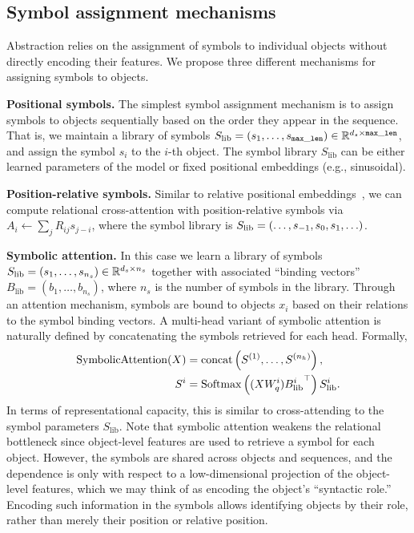 \subsection{Symbol assignment mechanisms}\label{ssec:symbol_assignment}
Abstraction relies on the assignment of symbols to individual objects without directly encoding their features. We propose three different mechanisms for assigning symbols to objects.

\textbf{Positional symbols.} The simplest symbol assignment mechanism is to assign symbols to objects sequentially based on the order they appear in the sequence. That is, we maintain a library of symbols $S_{\mathrm{lib}} = (s_1, \ldots, s_{\mathtt{max\_len}}) \in \mathbb{R}^{d_s \times \mathtt{max\_len}}$, and assign the symbol $s_i$ to the $i$-th object. The symbol library $S_\mathrm{lib}$ can be either learned parameters of the model or fixed positional embeddings (e.g., sinusoidal). %

\textbf{Position-relative symbols.} Similar to relative positional embeddings~\citep{shaw2018self,kazemnejadImpactPositionalEncoding2023}, we can compute relational cross-attention with position-relative symbols via $A_i \gets \sum_j R_{ij} s_{j-i}$, where the symbol library is $S_{\mathrm{lib}} = \left(\ldots, s_{-1}, s_0, s_1, \ldots\right)$.

\textbf{Symbolic attention.} In this case we learn a library of symbols $S_{\mathrm{lib}} = (s_1, \ldots, s_{n_s}) \in \mathbb{R}^{d_s \times n_s}$ together with associated ``binding vectors'' $B_{\mathrm{lib}} = (b_1, \ldots, b_{n_s})$, where $n_s$ is the number of symbols in the library. Through an attention mechanism, symbols are bound to objects $x_i$ based on their relations to the symbol binding vectors. A multi-head variant of symbolic attention is naturally defined by concatenating the symbols retrieved for each head. Formally, 
\begin{equation}
    \begin{split}
        \mathrm{SymbolicAttention}(X) &= \mathrm{concat}\left(S^{(1)}, \ldots, S^{(n_h)}\right), \\
        S^{i} &= \mathrm{Softmax} \left((X W_q^{i}) {B_{\mathrm{lib}}^{i}}^\top\right) S_{\mathrm{lib}}^{i}.
    \end{split}
\end{equation}
In terms of representational capacity, this is similar to cross-attending to the symbol parameters $S_{\mathrm{lib}}$.
Note that symbolic attention weakens the relational bottleneck since object-level features are used to retrieve a symbol for each object. However, 
the symbols are shared across objects and sequences, and the dependence is only with respect to a low-dimensional projection of the object-level features, which we may think of as encoding the object's ``syntactic role.'' Encoding such information in the symbols allows identifying objects by their role, rather than merely their position or relative position.

